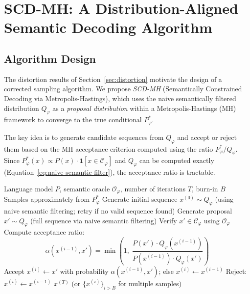 \documentclass[twoside,11pt]{article}
\newcommand{\Oracle}{\mathcal{O}}
\newcommand{\Constraint}{\mathcal{C}}
\newcommand{\indicator}{\mathbf{1}}
\begin{document}
\section{SCD-MH: A Distribution-Aligned Semantic Decoding Algorithm}
\label{sec:scdmh}

\subsection{Algorithm Design}
\label{sec:algorithm-design}

The distortion results of Section~\ref{sec:distortion} motivate the design
of a corrected sampling algorithm. We propose \emph{SCD-MH} (Semantically
Constrained Decoding via Metropolis-Hastings), which uses the naive
semantically filtered distribution $Q_\varphi$ as a \emph{proposal
distribution} within a Metropolis-Hastings (MH) framework
\citep{metropolis1953equation, hastings1970monte} to converge to the true
conditional $P^*_\varphi$.

The key idea is to generate candidate sequences from $Q_\varphi$ and
accept or reject them based on the MH acceptance criterion computed
using the ratio $P^*_\varphi / Q_\varphi$. Since $P^*_\varphi(x) \propto
P(x) \cdot \indicator[x \in \Constraint_\varphi]$ and $Q_\varphi$ can
be computed exactly (Equation~\ref{eq:naive-semantic-filter}), the
acceptance ratio is tractable.

\begin{algorithm}[t]
\caption{SCD-MH: Semantically Constrained Decoding via Metropolis-Hastings}
\label{alg:scdmh}
\begin{algorithmic}[1]
\REQUIRE Language model $P$, semantic oracle $\Oracle_\varphi$, number of
iterations $T$, burn-in $B$
\ENSURE Samples approximately from $P^*_\varphi$
\STATE Generate initial sequence $x^{(0)} \sim Q_\varphi$ (using naive
semantic filtering; retry if no valid sequence found)
    \STATE Generate proposal $x' \sim Q_\varphi$ (full sequence via
    naive semantic filtering)
    \STATE Verify $x' \in \Constraint_\varphi$ using $\Oracle_\varphi$
    \IF{$\Oracle_\varphi(x') = \textsc{Sat}$}
        \STATE Compute acceptance ratio:
        \[
        \alpha(x^{(i-1)}, x') = \min\!\left(1,\;
        \frac{P(x') \cdot Q_\varphi(x^{(i-1)})}{P(x^{(i-1)}) \cdot
        Q_\varphi(x')}\right)
        \]
        \STATE Accept $x^{(i)} \leftarrow x'$ with probability
        $\alpha(x^{(i-1)}, x')$; else $x^{(i)} \leftarrow x^{(i-1)}$
    \ELSE
        \STATE Reject: $x^{(i)} \leftarrow x^{(i-1)}$
    \ENDIF
\ENDFOR
\RETURN $x^{(T)}$ (or $\{x^{(i)}\}_{i > B}$ for multiple samples)
\end{algorithmic}
\end{algorithm}
\end{document}
